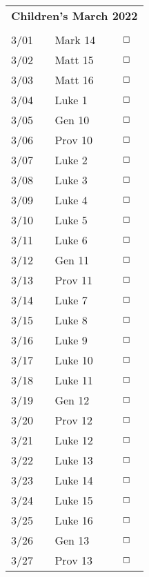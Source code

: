 \documentclass[10pt,landscape,letterpaper]{article}
\begin{document}
\begin{multicols}{5}
\begin{tabular}{p{0.5in}p{0.65in}p{0.3in}}
\multicolumn{3}{c}{\textbf{Children's March 2022}} \\
     &       &             \\
3/01 & Mark 14 & $\boxempty$ \\
3/02 & Matt 15 & $\boxempty$ \\
3/03 & Matt 16 & $\boxempty$ \\
3/04 & Luke 1 & $\boxempty$ \\
\textcolor[rgb]{1.00,0.00,0.00}{3/05} & \textcolor[rgb]{1.00,0.00,0.00}{Gen 10} & $\boxempty$ \\
\textcolor[rgb]{1.00,0.00,0.00}{3/06} & \textcolor[rgb]{1.00,0.00,0.00}{Prov 10} & $\boxempty$ \\

3/07 & Luke 2 & $\boxempty$ \\
3/08 & Luke 3 & $\boxempty$ \\
3/09 & Luke 4 & $\boxempty$ \\
3/10 & Luke 5 & $\boxempty$ \\
3/11 & Luke 6 & $\boxempty$ \\
\textcolor[rgb]{1.00,0.00,0.00}{3/12} & \textcolor[rgb]{1.00,0.00,0.00}{Gen 11} & $\boxempty$ \\
\textcolor[rgb]{1.00,0.00,0.00}{3/13} & \textcolor[rgb]{1.00,0.00,0.00}{Prov 11} & $\boxempty$ \\

3/14 & Luke 7 & $\boxempty$ \\
3/15 & Luke 8 & $\boxempty$ \\
3/16 & Luke 9 & $\boxempty$ \\
3/17 & Luke 10 & $\boxempty$ \\
3/18 & Luke 11 & $\boxempty$ \\
\textcolor[rgb]{1.00,0.00,0.00}{3/19} & \textcolor[rgb]{1.00,0.00,0.00}{Gen 12} & $\boxempty$ \\
\textcolor[rgb]{1.00,0.00,0.00}{3/20} & \textcolor[rgb]{1.00,0.00,0.00}{Prov 12} & $\boxempty$ \\

3/21 & Luke 12 & $\boxempty$ \\
3/22 & Luke 13 & $\boxempty$ \\
3/23 & Luke 14 & $\boxempty$ \\
3/24 & Luke 15 & $\boxempty$ \\
3/25 & Luke 16 & $\boxempty$ \\
\textcolor[rgb]{1.00,0.00,0.00}{3/26} & \textcolor[rgb]{1.00,0.00,0.00}{Gen 13} & $\boxempty$ \\
\textcolor[rgb]{1.00,0.00,0.00}{3/27} & \textcolor[rgb]{1.00,0.00,0.00}{Prov 13} & $\boxempty$ \\


\end{tabular}
\end{multicols}
\end{document}
